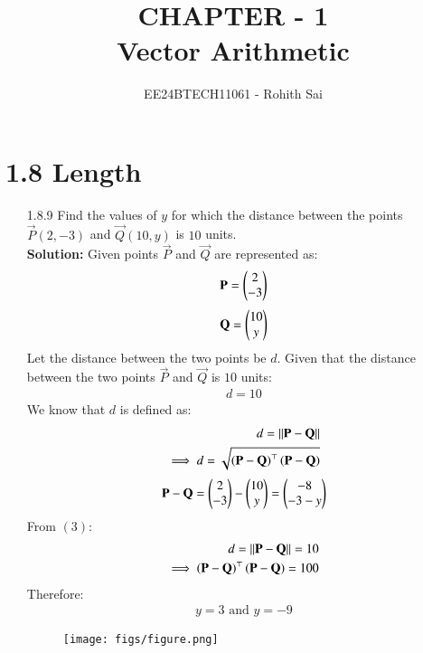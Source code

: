 \documentclass[journal]{IEEEtran}
\begin{document}

\vspace{3cm}

\title{CHAPTER - 1\\Vector Arithmetic}
\author{EE24BTECH11061 - Rohith Sai}
\maketitle

\renewcommand{\thefigure}{\theenumi}
\renewcommand{\thetable}{\theenumi}

\section{1.8 Length}
\begin{enumerate}
\item [1.8.9] Find the values of $y$ for which the distance between the points $\vec{P}(2, -3)$ and $\vec{Q}(10, y)$ is $10$ units.\\
\textbf{Solution:}
Given points $\vec{P}$ and $\vec{Q}$ are represented as:
\begin{align}
    \mathbf{P} = \begin{pmatrix}
2 \\ -3
\end{pmatrix}
\end{align}
\begin{align}
    \mathbf{Q} = \begin{pmatrix}
    10 \\ y
    \end{pmatrix}
\end{align}
Let the distance between the two points be $d$.
Given that the distance between the two points $\vec{P}$ and $\vec{Q}$ is $10$ units:
\begin{align}
    d=10
\end{align}
We know that $d$ is defined as:
\begin{align}
    d = \left\vert\left\vert\mathbf{P}-\mathbf{Q}\right\vert\right\vert\\
    \implies d = \sqrt{{\left(\mathbf{P}-\mathbf{Q}\right)}^\top\left(\mathbf{P}-\mathbf{Q}\right)}
\end{align}
\begin{align}
    \mathbf{P} - \mathbf{Q} = \begin{pmatrix}2\\-3\end{pmatrix} - \begin{pmatrix}10\\y\end{pmatrix} = \begin{pmatrix}-8\\-3-y\end{pmatrix}\\
\end{align}
From $(3)$:
\begin{align}
    d = \left\vert\left\vert\mathbf{P}-\mathbf{Q}\right\vert\right\vert = 10\\
    \implies {\ensuremath{\left(\mathbf{P}-\mathbf{Q}\right)}}^\top\left(\mathbf{P}-\mathbf{Q}\right) = 100
\end{align}
Therefore:
\begin{align}
    y = 3 \text{ and } y = -9
\end{align}
\begin{figure}[htp]
    \centering
    \texttt{[image: figs/figure.png]}
    \label{fig:figure}
\end{figure}
\end{enumerate}
\end{document}
